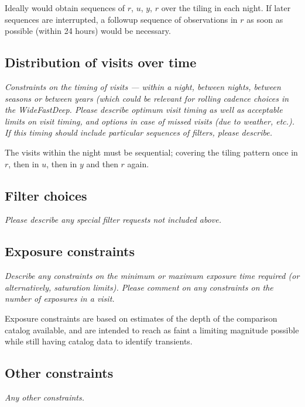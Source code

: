 \documentclass[11pt]{article}
\begin{document}
Ideally would obtain sequences of $r$, $u$, $y$, $r$ over the tiling in each night. If later sequences are interrupted, a
followup sequence of observations in $r$ as soon as possible (within 24 hours) would be necessary. 

\subsection{Distribution of visits over time}
\begin{footnotesize}{\it Constraints on the timing of visits --- within a night, between nights, between seasons or
between years (which could be relevant for rolling cadence choices in the WideFastDeep. 
Please describe optimum visit timing as well as acceptable limits on visit timing, and options in
case of missed visits (due to weather, etc.). If this timing should include particular sequences
of filters, please describe.}
\end{footnotesize}

The visits within the night must be sequential; covering the tiling pattern once in $r$, then in $u$, then in $y$ and then $r$ again.

\subsection{Filter choices}
\begin{footnotesize}
{\it Please describe any special filter requests not included above.}
\end{footnotesize}

\subsection{Exposure constraints}
\begin{footnotesize}
{\it Describe any constraints on the minimum or maximum exposure time required (or alternatively, saturation limits).
Please comment on any constraints on the number of exposures in a visit.}
\end{footnotesize}

Exposure constraints are based on estimates of the depth of the comparison catalog available, and are intended to
reach as faint a limiting magnitude possible while still having catalog data to identify transients.

\subsection{Other constraints}
\begin{footnotesize}
{\it Any other constraints.}
\end{footnotesize}
\end{document}
